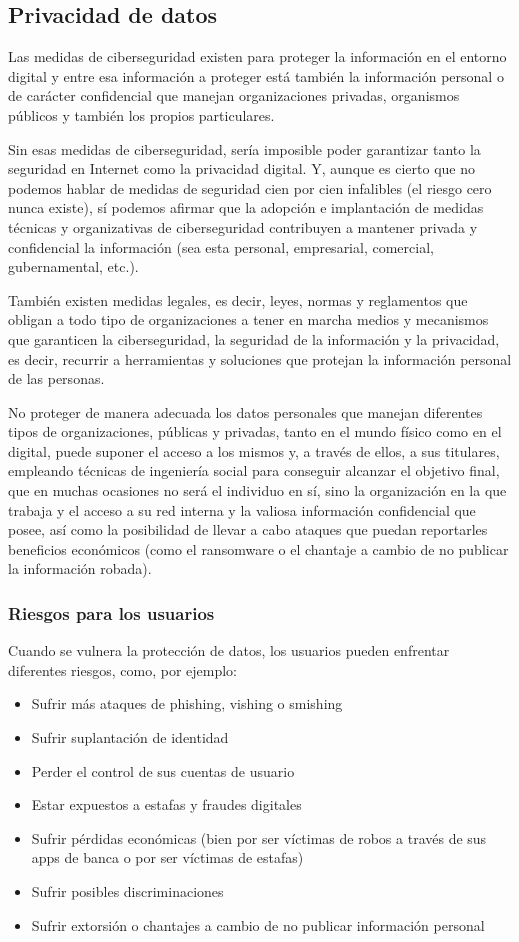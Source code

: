 \documentclass[12pt]{article}
\begin{document}
  \subsection*{Privacidad de datos}
  Las medidas de ciberseguridad existen para proteger la información en el entorno digital y entre esa información a proteger está también la información personal o de carácter confidencial que manejan organizaciones privadas, organismos públicos y también los propios particulares.

  Sin esas medidas de ciberseguridad, sería imposible poder garantizar tanto la seguridad en Internet como la privacidad digital. Y, aunque es cierto que no podemos hablar de medidas de seguridad cien por cien infalibles (el riesgo cero nunca existe), sí podemos afirmar que la adopción e implantación de medidas técnicas y organizativas de ciberseguridad contribuyen a mantener privada y confidencial la información (sea esta personal, empresarial, comercial, gubernamental, etc.).

  También existen medidas legales, es decir, leyes, normas y reglamentos que obligan a todo tipo de organizaciones a tener en marcha medios y mecanismos que garanticen la ciberseguridad, la seguridad de la información y la privacidad, es decir, recurrir a herramientas y soluciones que protejan la información personal de las personas.

  No proteger de manera adecuada los datos personales que manejan diferentes tipos de organizaciones, públicas y privadas, tanto en el mundo físico como en el digital, puede suponer el acceso a los mismos y, a través de ellos, a sus titulares, empleando técnicas de ingeniería social para conseguir alcanzar el objetivo final, que en muchas ocasiones no será el individuo en sí, sino la organización en la que trabaja y el acceso a su red interna y la valiosa información confidencial que posee, así como la posibilidad de llevar a cabo ataques que puedan reportarles beneficios económicos (como el ransomware o el chantaje a cambio de no publicar la información robada).

  \subsubsection*{Riesgos para los usuarios}
  Cuando se vulnera la protección de datos, los usuarios pueden enfrentar diferentes riesgos, como, por ejemplo:

  \begin{itemize}
    \item Sufrir más ataques de phishing, vishing o smishing
    \item Sufrir suplantación de identidad
    \item Perder el control de sus cuentas de usuario
    \item Estar expuestos a estafas y fraudes digitales
    \item Sufrir pérdidas económicas (bien por ser víctimas de robos a través de sus apps de banca o por ser víctimas de estafas)
    \item Sufrir posibles discriminaciones
    \item Sufrir extorsión o chantajes a cambio de no publicar información personal
  \end{itemize}
\end{document}

